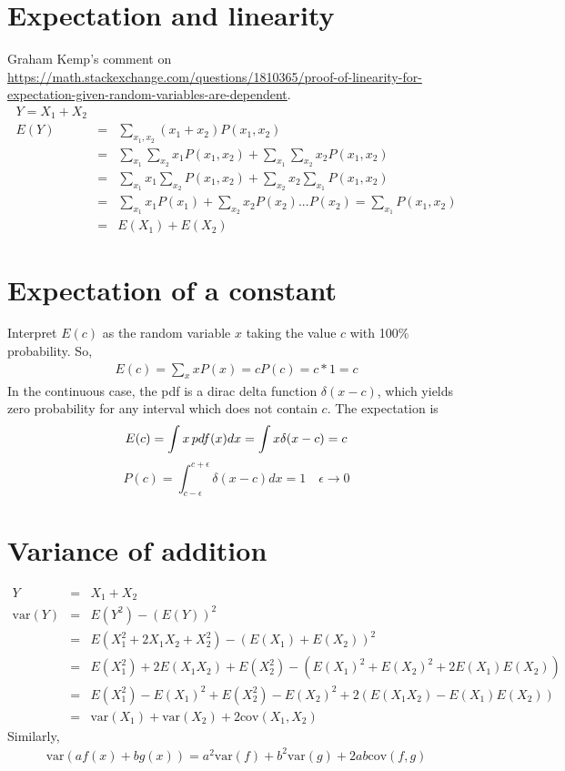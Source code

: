 \documentclass{article}
\newcommand{\beq}{\begin{equation}}
\newcommand{\eeq}{\end{equation}}
\newcommand{\ber}{\begin{eqnarray}}
\newcommand{\eer}{\end{eqnarray}}
\begin{document}
\section{Expectation and linearity}
Graham Kemp's comment on \url{https://math.stackexchange.com/questions/1810365/proof-of-linearity-for-expectation-given-random-variables-are-dependent}.
\ber
Y = X_1 + X_2 \\
E(Y) &=& \sum_{x_1,x_2}(x_1 + x_2)P(x_1,x_2) \\
&=& \sum_{x_1}\sum_{x_2}x_1P(x_1,x_2) + \sum_{x_1}\sum_{x_2}x_2P(x_1,x_2) \\
&=& \sum_{x_1}x_1\sum_{x_2}P(x_1,x_2)  + \sum_{x_2}x_2\sum_{x_1}P(x_1,x_2) \\
&=& \sum_{x_1}x_1P(x_1) + \sum_{x_2}x_2P(x_2) \text{...}P(x_2)=\sum_{x_1}P(x_1,x_2)\\
&=& E(X_1) + E(X_2)
\eer
\section{Expectation of a constant}
Interpret $E(c)$ as the random variable $x$ taking the value $c$ with 100\% probability. So,
\ber
E(c) = \sum_{x}xP(x) = cP(c) = c*1 = c
\eer
In the continuous case, the pdf is a dirac delta function $\delta(x-c)$, which yields zero probability for any interval which does not contain $c$. The expectation is
\beq
E(c) = \int x\, pdf(x) dx = \int x \delta(x-c) = c \\
\eeq
{}
\beq
P(c) = \int_{c-\epsilon}^{c+\epsilon}\delta(x-c) dx = 1  \quad \epsilon\rightarrow{0}
\eeq

\section{Variance of addition}
\ber
Y &=& X_1 + X_2 \\
\text{var}(Y) &=& E(Y^2) - (E(Y))^2\\
&=& E(X_1^2 + 2X_1X_2 + X_2^2) - (E(X_1) + E(X_2))^2 \\
&=& E(X_1^2) + 2E(X_1X_2) + E(X_2^2) - (E(X_1)^2 + E(X_2)^2 + 2E(X_1)E(X_2)) \\
&=& E(X_1^2) - E(X_1)^2 + E(X_2^2) - E(X_2)^2 +2(E(X_1X_2)-E(X_1)E(X_2)) \\
&=& \text{var}(X_1) + \text{var}(X_2) +2\text{cov}(X_1,X_2)
\eer
Similarly,
\ber
\text{var}(af(x)+bg(x)) = a^2\text{var}(f) + b^2\text{var}(g) +2ab\text{cov}(f,g) 
\eer
\end{document}
